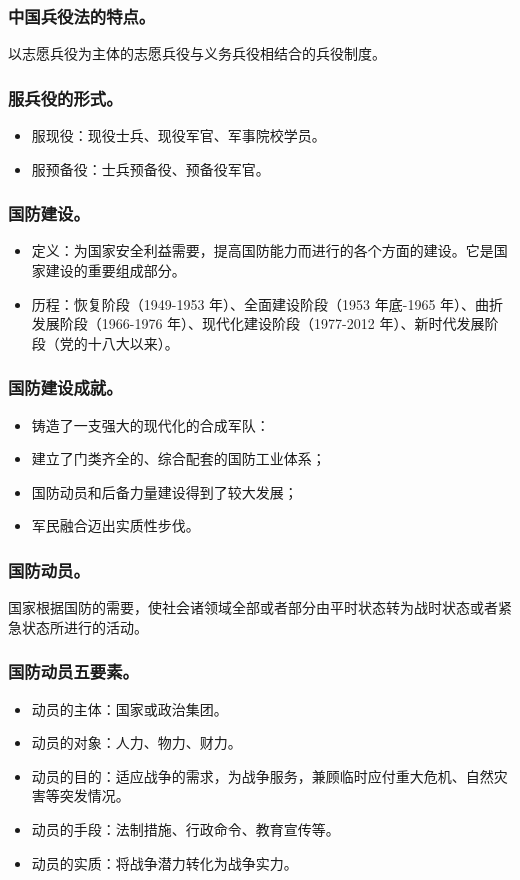 \documentclass{article}
\begin{document}
\subsubsection{中国兵役法的特点。}
以志愿兵役为主体的志愿兵役与义务兵役相结合的兵役制度。
    
\subsubsection{服兵役的形式。}
\begin{itemize}
    \item 服现役：现役士兵、现役军官、军事院校学员。
    \item 服预备役：士兵预备役、预备役军官。
\end{itemize}

\subsubsection{国防建设。}
\begin{itemize}
    \item 定义：为国家安全利益需要，提高国防能力而进行的各个方面的建设。它是国家建设的重要组成部分。
    \item 历程：恢复阶段（1949-1953 年）、全面建设阶段（1953 年底-1965 年）、曲折发展阶段（1966-1976 年）、现代化建设阶段（1977-2012 年）、新时代发展阶段（党的十八大以来）。
\end{itemize}
    
\subsubsection{国防建设成就。}
\begin{itemize}
    \item 铸造了一支强大的现代化的合成军队：
    \item 建立了门类齐全的、综合配套的国防工业体系；
    \item 国防动员和后备力量建设得到了较大发展；
    \item 军民融合迈出实质性步伐。
\end{itemize}

\subsubsection{国防动员。}
国家根据国防的需要，使社会诸领域全部或者部分由平时状态转为战时状态或者紧急状态所进行的活动。

\subsubsection{国防动员五要素。}
\begin{itemize}
    \item 动员的主体：国家或政治集团。
    \item 动员的对象：人力、物力、财力。
    \item 动员的目的：适应战争的需求，为战争服务，兼顾临时应付重大危机、自然灾害等突发情况。
    \item 动员的手段：法制措施、行政命令、教育宣传等。
    \item 动员的实质：将战争潜力转化为战争实力。
\end{itemize}
    
\end{document}
